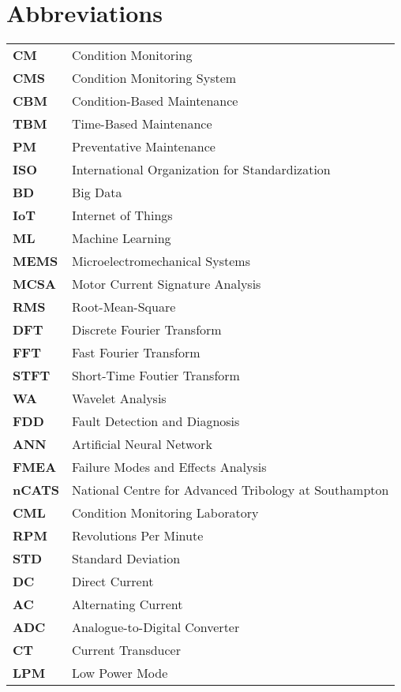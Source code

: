 \chapter*{Abbreviations}

\begin{table}[h!]
    \renewcommand{\arraystretch}{1.2}
		\begin{tabular}{l|l}%
		    \textbf{CM} \quad & \quad Condition Monitoring\\
		    \textbf{CMS} \quad & \quad Condition Monitoring System\\
			\textbf{CBM} \quad & \quad Condition-Based Maintenance\\
			\textbf{TBM} \quad & \quad Time-Based Maintenance\\
			\textbf{PM} \quad &\quad  Preventative Maintenance\\
			\textbf{ISO} \quad & \quad International Organization for Standardization\\
			\textbf{BD} \quad &\quad  Big Data\\
			\textbf{IoT} \quad &\quad Internet of Things\\
			\textbf{ML} \quad &\quad Machine Learning\\
			\textbf{MEMS}\quad  & \quad Microelectromechanical Systems\\
			\textbf{MCSA}\quad  & \quad Motor Current Signature Analysis\\
			\textbf{RMS} \quad &\quad  Root-Mean-Square\\
			\textbf{DFT} \quad &\quad  Discrete Fourier Transform\\
			\textbf{FFT} \quad & \quad Fast Fourier Transform\\
			\textbf{STFT} \quad &\quad  Short-Time Foutier Transform\\
			\textbf{WA} \quad &\quad  Wavelet Analysis\\
			\textbf{FDD} \quad &\quad  Fault Detection and Diagnosis\\
			\textbf{ANN} \quad &\quad  Artificial Neural Network\\
			\textbf{FMEA}\quad  &\quad  Failure Modes and Effects Analysis\\
			\textbf{nCATS} \quad &\quad  National Centre for Advanced Tribology at Southampton\\
			\textbf{CML} \quad &\quad  Condition Monitoring Laboratory\\
			\textbf{RPM} \quad &\quad  Revolutions Per Minute\\
			\textbf{STD} \quad &\quad  Standard Deviation\\
			\textbf{DC} \quad & \quad Direct Current\\
			\textbf{AC} \quad & \quad Alternating Current\\
			\textbf{ADC}\quad  &\quad  Analogue-to-Digital Converter\\
			\textbf{CT} \quad &\quad  Current Transducer\\
			\textbf{LPM}\quad &\quad  Low Power Mode\\
			
			
		\end{tabular}
		\label{tab:abbreviations}%
\end{table}